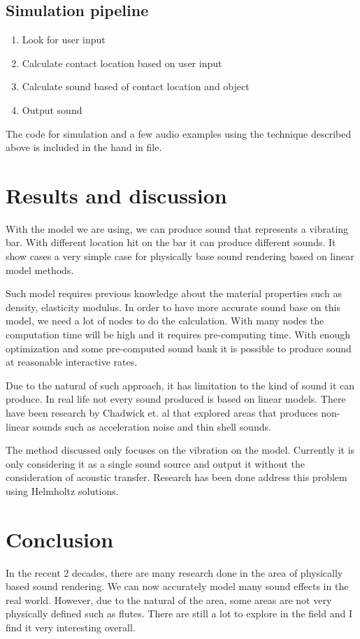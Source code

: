 \documentclass[11pt]{article}
\begin{document}
\subsection*{Simulation pipeline}
\begin{enumerate}
    \item Look for user input
    \item Calculate contact location based on user input
    \item Calculate sound based of contact location and object
    \item Output sound
\end{enumerate}

The code for simulation and a few audio examples using the technique described above is included in the hand in file.

\section*{Results and discussion}
With the model we are using, we can produce sound that represents a vibrating bar. With different location hit on the bar it can produce different sounds. It show cases a very simple case for physically base sound rendering based on linear model methods.

Such model requires previous knowledge about the material properties such as density, elasticity modulus. In order to have more accurate sound base on this model, we need a lot of nodes to do the calculation. With many nodes the computation time will be high and it requires pre-computing time. With enough optimization and some pre-computed sound bank it is possible to produce sound at reasonable interactive rates. \cite{Lin2013}

Due to the natural of such approach, it has limitation to the kind of sound it can produce. In real life not every sound produced is based on linear models. There have been research by Chadwick et. al \cite{Chadwick12} that explored areas that produces non-linear sounds such as acceleration noise and thin shell sounds.

The method discussed only focuses on the vibration on the model. Currently it is only considering it as a single sound source and output it without the consideration of acoustic transfer. Research has been done address this problem using Helmholtz solutions. \cite{James2006}

\section*{Conclusion}
In the recent 2 decades, there are many research done in the area of physically based sound rendering. We can now accurately model many sound effects in the real world. However, due to the natural of the area, some areas are not very physically defined such as flutes. There are still a lot to explore in the field and I find it very interesting overall.




\end{document}
